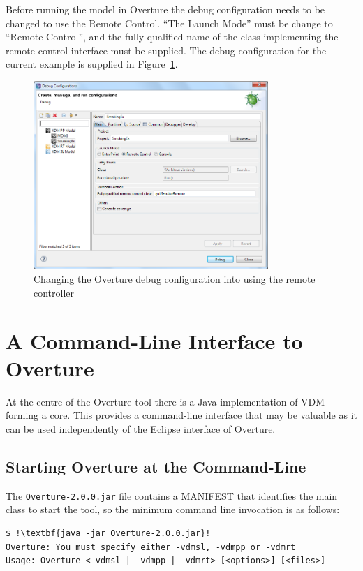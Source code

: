 \documentclass{overturerepchap}
\begin{document}
Before running the model in Overture the debug configuration needs to be changed to use the Remote Control. ``The Launch Mode'' must be change to ``Remote Control'', and the fully qualified name of the class implementing the remote control interface must be supplied. The debug configuration for the current example is supplied in Figure~\ref{fig:gui:DebugConfiguration}.

\begin{figure}[h]
\begin{center}
  \includegraphics[width=3.5in]{figures/SmokersDebugConfig}
  \caption[labelInTOC]{Changing the Overture debug configuration into using the remote controller}
  \label{fig:gui:DebugConfiguration}
\end{center}
\end{figure}



\chapter{A Command-Line Interface to Overture}\label{sec:commandline}

At the centre of the Overture tool there is a Java implementation of VDM
forming a core. This provides a command-line interface that may be valuable
as it can be used independently of the Eclipse interface of Overture.

\section{Starting Overture at the Command-Line}

The \texttt{Overture-2.0.0.jar} file contains a MANIFEST that identifies the main class to start the
tool, so the minimum command line invocation is as follows:

\lstset{style=tool,language=}
\begin{lstlisting}
$ !\textbf{java -jar Overture-2.0.0.jar}!
Overture: You must specify either -vdmsl, -vdmpp or -vdmrt
Usage: Overture <-vdmsl | -vdmpp | -vdmrt> [<options>] [<files>]
\end{lstlisting}
\lstset{style=mystyle}
\lstset{language=VDM++}
\end{document}
